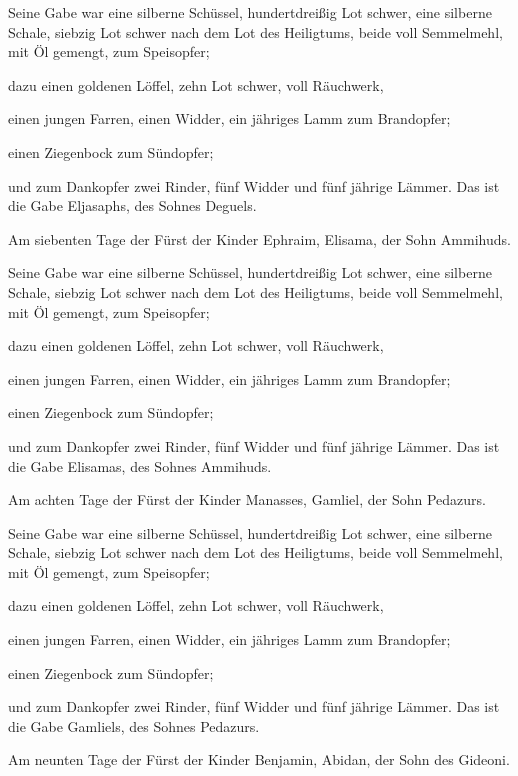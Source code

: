  Seine Gabe war eine silberne Schüssel, hundertdreißig Lot
schwer, eine silberne Schale, siebzig Lot schwer nach dem Lot des
Heiligtums, beide voll Semmelmehl, mit Öl gemengt, zum Speisopfer;

 dazu einen goldenen Löffel, zehn Lot schwer, voll
Räuchwerk,

 einen jungen Farren, einen Widder, ein jähriges Lamm zum
Brandopfer;

 einen Ziegenbock zum Sündopfer;

 und zum Dankopfer zwei Rinder, fünf Widder und fünf
jährige Lämmer. Das ist die Gabe Eljasaphs, des Sohnes Deguels.

 Am siebenten Tage der Fürst der Kinder Ephraim, Elisama,
der Sohn Ammihuds.

 Seine Gabe war eine silberne Schüssel, hundertdreißig Lot
schwer, eine silberne Schale, siebzig Lot schwer nach dem Lot des
Heiligtums, beide voll Semmelmehl, mit Öl gemengt, zum Speisopfer;

 dazu einen goldenen Löffel, zehn Lot schwer, voll
Räuchwerk,

 einen jungen Farren, einen Widder, ein jähriges Lamm zum
Brandopfer;

 einen Ziegenbock zum Sündopfer;

 und zum Dankopfer zwei Rinder, fünf Widder und fünf
jährige Lämmer. Das ist die Gabe Elisamas, des Sohnes Ammihuds.

 Am achten Tage der Fürst der Kinder Manasses, Gamliel, der
Sohn Pedazurs.

 Seine Gabe war eine silberne Schüssel, hundertdreißig Lot
schwer, eine silberne Schale, siebzig Lot schwer nach dem Lot des
Heiligtums, beide voll Semmelmehl, mit Öl gemengt, zum Speisopfer;

 dazu einen goldenen Löffel, zehn Lot schwer, voll
Räuchwerk,

 einen jungen Farren, einen Widder, ein jähriges Lamm zum
Brandopfer;

 einen Ziegenbock zum Sündopfer;

 und zum Dankopfer zwei Rinder, fünf Widder und fünf
jährige Lämmer. Das ist die Gabe Gamliels, des Sohnes Pedazurs.

 Am neunten Tage der Fürst der Kinder Benjamin, Abidan, der
Sohn des Gideoni.

